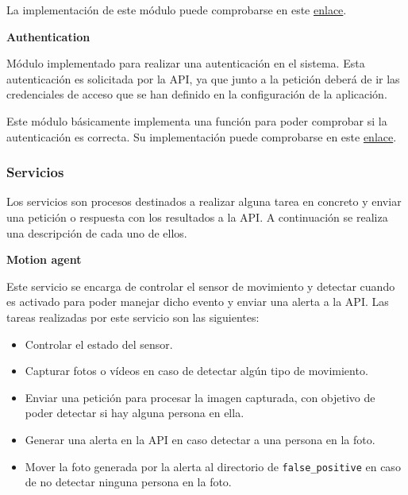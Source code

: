 \vspace{-0.5cm}

La implementación de este módulo puede comprobarse en este \href{https://github.com/jmv74211/TFM_security_system_PI/blob/master/src/modules/video.py}{enlace}.

\textbf{Authentication} 

Módulo implementado para realizar una autenticación en el sistema. Esta autenticación es solicitada por la API, ya que junto a la petición deberá de ir las credenciales de acceso que se han definido en la configuración de la aplicación.

Este módulo básicamente implementa una función para poder comprobar si la autenticación es correcta. Su implementación puede comprobarse en este \href{https://github.com/jmv74211/TFM_security_system_PI/blob/master/src/modules/authentication.py}{enlace}.

\subsubsection{Servicios}

Los servicios son procesos destinados a realizar alguna tarea en concreto y enviar una petición o respuesta con los resultados a la API. A continuación se realiza una descripción de cada uno de ellos.

\textbf{Motion agent}

Este servicio se encarga de controlar el sensor de movimiento y detectar cuando es activado para poder manejar dicho evento y enviar una alerta a la API. Las tareas realizadas por este servicio son las siguientes:

\vspace{-0.5cm}

\begin{itemize}
\item Controlar el estado del sensor.
\item Capturar fotos o vídeos en caso de detectar algún tipo de movimiento.
\item Enviar una petición para procesar la imagen capturada, con objetivo de poder detectar si hay alguna persona en ella.
\item Generar una alerta en la API en caso detectar a una persona en la foto.
\item Mover la foto generada por la alerta al directorio de \texttt{false\_positive} en caso de no detectar ninguna persona en la foto.

\end{itemize}

